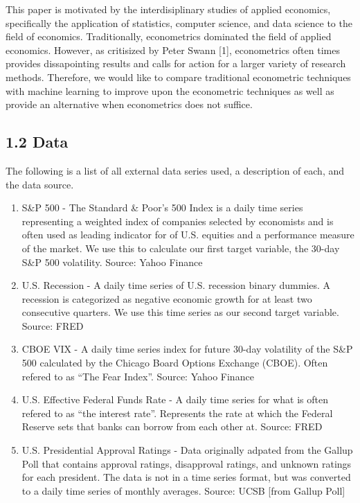 \documentclass[]{article}
\providecommand{\tightlist}{%
  \setlength{\itemsep}{0pt}\setlength{\parskip}{0pt}}
\begin{document}
This paper is motivated by the interdisiplinary studies of applied
economics, specifically the application of statistics, computer science,
and data science to the field of economics. Traditionally, econometrics
dominated the field of applied economics. However, as critisized by
Peter Swann {[}1{]}, econometrics often times provides dissapointing
results and calls for action for a larger variety of research methods.
Therefore, we would like to compare traditional econometric techniques
with machine learning to improve upon the econometric techniques as well
as provide an alternative when econometrics does not suffice.

\subsection{1.2 Data}\label{data}

The following is a list of all external data series used, a description
of each, and the data source.

\begin{enumerate}
\def\labelenumi{\arabic{enumi}.}
\tightlist
\item
  S\&P 500 - The Standard \& Poor's 500 Index is a daily time series
  representing a weighted index of companies selected by economists and
  is often used as leading indicator for of U.S. equities and a
  performance measure of the market. We use this to calculate our first
  target variable, the 30-day S\&P 500 volatility. Source: Yahoo Finance
\item
  U.S. Recession - A daily time series of U.S. recession binary dummies.
  A recession is categorized as negative economic growth for at least
  two consecutive quarters. We use this time series as our second target
  variable. Source: FRED
\item
  CBOE VIX - A daily time series index for future 30-day volatility of
  the S\&P 500 calculated by the Chicago Board Options Exchange (CBOE).
  Often refered to as ``The Fear Index''. Source: Yahoo Finance
\item
  U.S. Effective Federal Funds Rate - A daily time series for what is
  often refered to as ``the interest rate''. Represents the rate at
  which the Federal Reserve sets that banks can borrow from each other
  at. Source: FRED
\item
  U.S. Presidential Approval Ratings - Data originally adpated from the
  Gallup Poll that contains approval ratings, disapproval ratings, and
  unknown ratings for each president. The data is not in a time series
  format, but was converted to a daily time series of monthly averages.
  Source: UCSB {[}from Gallup Poll{]}
\end{enumerate}
\end{document}
